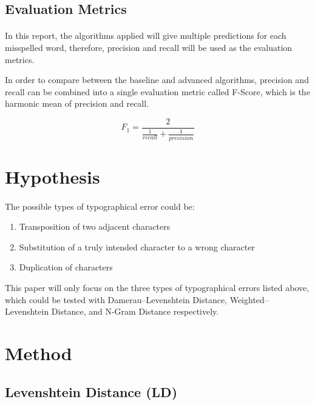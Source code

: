 \documentclass[11pt]{article}
\begin{document}
\subsection{Evaluation Metrics}

\paragraph{} In this report, the algorithms applied will give multiple predictions for each misspelled word, therefore, precision and recall will be used as the evaluation metrics.

In order to compare between the baseline and advanced algorithms, precision and recall can be combined into a single evaluation metric called F-Score, which is the harmonic mean of precision and recall.\cite{InfromationRetrieval}

$$ 
F_1  = \frac{2}{\frac{1}{recall} + \frac{1}{precision}}
$$

\section{Hypothesis}

\paragraph{} The possible types of typographical error could be: 

\begin{enumerate}
\item
Transposition of two adjacent characters

\item
Substitution of a truly intended character to a wrong character

\item
Duplication of characters
\end{enumerate}

This paper will only focus on the three types of typographical errors listed above, which could be tested with Damerau–Levenshtein Distance, Weighted–Levenshtein Distance, and N-Gram Distance respectively.

\section{Method}

\subsection{Levenshtein Distance (LD)}
\end{document}
